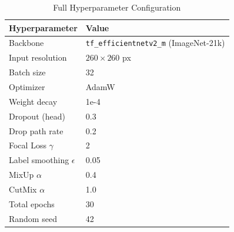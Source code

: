\documentclass[12pt,a4paper]{article}
\begin{document}
\begin{table}[H]
\centering
\caption{Full Hyperparameter Configuration}
\label{tab:hyperparams}
\begin{tabular}{|l|l|}
    \hline
    \textbf{Hyperparameter} & \textbf{Value} \\
    \hline
    Backbone          & \texttt{tf\_efficientnetv2\_m} (ImageNet-21k) \\
    \hline
    Input resolution  & $260 \times 260$ px \\
    \hline
    Batch size        & 32 \\
    \hline
    Optimizer         & AdamW \\
    \hline
    Weight decay      & 1e-4 \\
    \hline
    Dropout (head)    & 0.3 \\
    \hline
    Drop path rate    & 0.2 \\
    \hline
    Focal Loss $\gamma$ & 2 \\
    \hline
    Label smoothing $\epsilon$ & 0.05 \\
    \hline
    MixUp $\alpha$    & 0.4 \\
    \hline
    CutMix $\alpha$   & 1.0 \\
    \hline
    Total epochs      & 30 \\
    \hline
    Random seed       & 42 \\
    \hline
\end{tabular}
\end{table}
\end{document}
